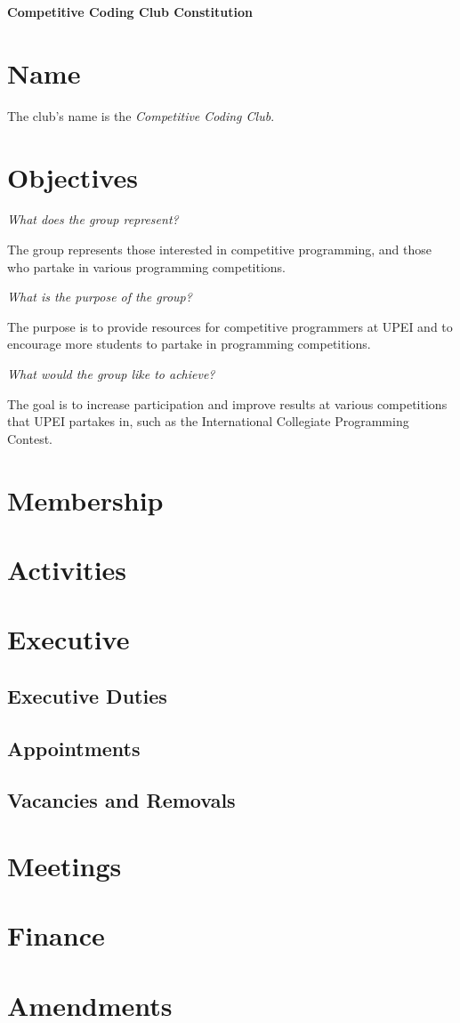 \documentclass[11pt]{article}
\begin{document}
{\fontsize{20}{24}\center\bfseries Competitive Coding Club Constitution \par}

\section{Name}

The club's name is the \textit{Competitive Coding Club}.

\section{Objectives}

\textit{What does the group represent?}

\noindent
The group represents those interested in competitive programming, and those who partake in various programming competitions.

\vspace{2mm}
\noindent
\textit{What is the purpose of the group?}

\noindent
The purpose is to provide resources for competitive programmers at UPEI and to encourage more students to partake in programming competitions.

\vspace{2mm}
\noindent
\textit{What would the group like to achieve?}

\noindent
The goal is to increase participation and improve results at various competitions that UPEI partakes in, such as the International Collegiate Programming Contest.

\section{Membership}

\section{Activities}

\section{Executive}

\subsection{Executive Duties}

\subsection{Appointments}

\subsection{Vacancies and Removals}

\section{Meetings}

\section{Finance}

\section{Amendments}
\end{document}
